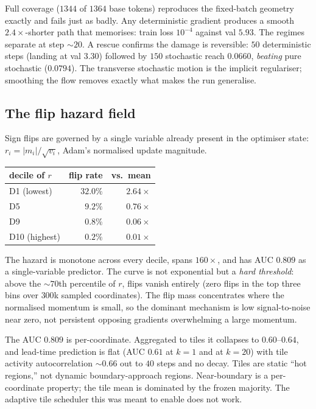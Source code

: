 Full coverage ($1344$ of $1364$ base tokens) reproduces the fixed-batch
geometry exactly and fails just as badly. Any deterministic gradient produces a
smooth $2.4\times$-shorter path that memorises: train loss $10^{-4}$ against val
$5.93$. The regimes separate at step $\sim\!20$. A rescue confirms the damage is
reversible: $50$ deterministic steps (landing at val $3.30$) followed by $150$
stochastic reach $0.0660$, \emph{beating} pure stochastic ($0.0794$). The
transverse stochastic motion is the implicit regulariser; smoothing the flow
removes exactly what makes the run generalise.

\subsection{The flip hazard field}
\label{sec:hazard}

Sign flips are governed by a single variable already present in the optimiser
state: $r_i = |m_i|/\sqrt{v_i}$, Adam's normalised update magnitude.

\begin{center}
\begin{tabular}{lrr}
\toprule
decile of $r$ & flip rate & vs.\ mean \\
\midrule
D1 (lowest)  & $32.0\%$ & $2.64\times$ \\
D5           & $\phantom{0}9.2\%$ & $0.76\times$ \\
D9           & $\phantom{0}0.8\%$ & $0.06\times$ \\
D10 (highest)& $\phantom{0}0.2\%$ & $0.01\times$ \\
\bottomrule
\end{tabular}
\end{center}

The hazard is monotone across every decile, spans $160\times$, and has AUC
$0.809$ as a single-variable predictor. The curve is not exponential but a
\emph{hard threshold}: above the $\sim\!70$th percentile of $r$, flips vanish
entirely (zero flips in the top three bins over $300$k sampled coordinates).
The flip mass concentrates where the normalised momentum is small, so the
dominant mechanism is low signal-to-noise near zero, not persistent opposing
gradients overwhelming a large momentum.

\begin{observation}
The AUC $0.809$ is per-coordinate. Aggregated to tiles it collapses to
$0.60$--$0.64$, and lead-time prediction is flat (AUC $0.61$ at $k=1$ and at
$k=20$) with tile activity autocorrelation $\sim\!0.66$ out to $40$ steps and no
decay. Tiles are static ``hot regions,'' not dynamic boundary-approach regions.
Near-boundary is a per-coordinate property; the tile mean is dominated by the
frozen majority. The adaptive tile scheduler this was meant to enable does not
work.
\end{observation}

